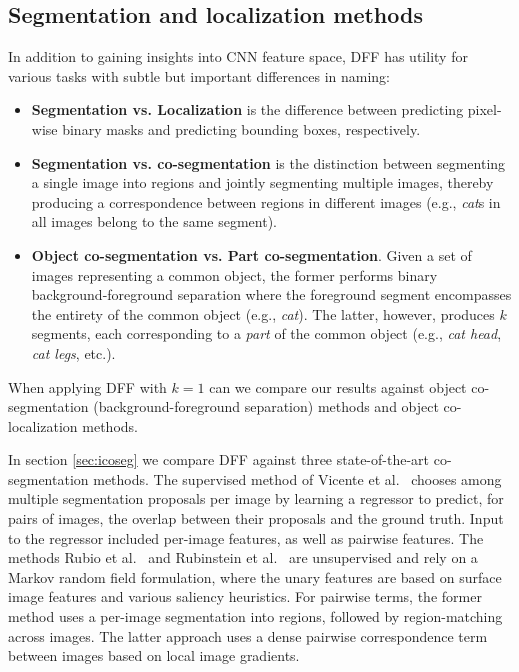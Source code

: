\documentclass[runningheads]{llncs}
\begin{document}
	\subsection{Segmentation and localization methods} \label{sec:baseline}
	In addition to gaining insights into CNN feature space, DFF has utility for various tasks with subtle but important differences in naming:
	\begin{itemize}
		\item \textbf{Segmentation vs. Localization} is the difference between predicting pixel-wise binary masks and predicting bounding boxes, respectively.
		\item \textbf{Segmentation vs. co-segmentation} is the distinction between segmenting a single image into regions and jointly segmenting multiple images, thereby producing a correspondence between regions in different images (e.g., \emph{cat}s in all images belong to the same segment).
		\item \textbf{Object co-segmentation vs. Part co-segmentation}. Given a set of images representing a common object, the former performs binary background-foreground separation where the foreground segment encompasses the entirety of the common object (e.g., \emph{cat}). The latter, however, produces $k$ segments, each corresponding to a \emph{part} of the common object (e.g., \emph{cat head}, \emph{cat legs}, etc.).
	\end{itemize}
	
	When applying DFF with $k=1$ can we compare our results against object co-segmentation (background-foreground separation) methods and object co-localization methods.
	
	In section \ref{sec:icoseg} we compare DFF against three state-of-the-art co-segmentation methods.	 
	The supervised method of Vicente et al.~\cite{vicente2011object} chooses among multiple segmentation proposals per image by learning a regressor to predict, for pairs of images, the overlap between their proposals and the ground truth. Input to the regressor included per-image features, as well as pairwise features.	 
	The methods Rubio et al.~\cite{rubio2012unsupervised} and Rubinstein et al.~\cite{Rubinstein13Unsupervised} are unsupervised and rely on a Markov random field formulation, where the unary features are based on surface image features and various saliency heuristics. For pairwise terms, the former method uses a per-image segmentation into regions, followed by region-matching across images.  The latter approach uses a dense pairwise correspondence term between images based on local image gradients.
	
\end{document}
